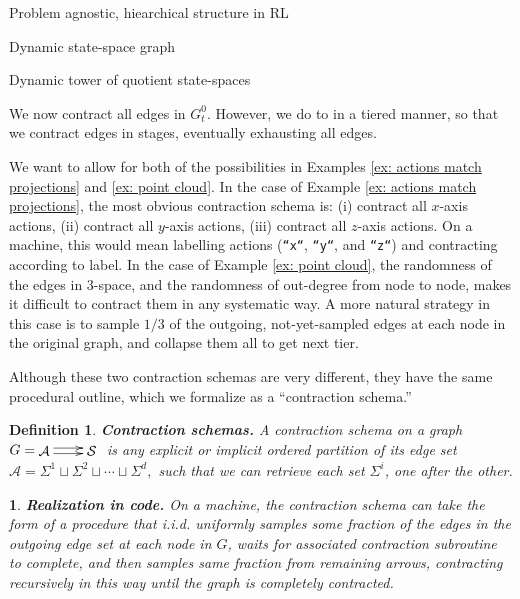 \documentclass[11pt]{article}
\newtheorem{definition}[subsubsection]{Definition}
\newtheorem{ermark}[subsubsection]{}
\begin{document}
\begin{section}{Problem agnostic, hiearchical structure in RL}
\begin{subsection}{Dynamic state-space graph}
\end{subsection}

\begin{subsection}{Dynamic tower of quotient state-spaces}

We now contract all edges in $G^{0}_{t}$. However, we do to in a tiered manner, so that we contract edges in stages, eventually exhausting all edges. 

We want to allow for both of the possibilities in Examples \ref{ex: actions match projections} and \ref{ex: point cloud}. In the case of Example \ref{ex: actions match projections}, the most obvious contraction schema is: (i) contract all $x$-axis actions, (ii) contract all $y$-axis actions, (iii) contract all $z$-axis actions. On a machine, this would mean labelling actions (\texttt{``x``}, \texttt{``y``}, and \texttt{``z``}) and contracting according to label. In the case of Example \ref{ex: point cloud}, the randomness of the edges in $3$-space, and the randomness of out-degree from node to node, makes it difficult to contract them in any systematic way. A more natural strategy in this case is to sample $1/3$ of the outgoing, not-yet-sampled edges at each node in the original graph, and collapse them all to get next tier.

Although these two contraction schemas are very different, they have the same procedural outline, which we formalize as a ``contraction schema.''

\begin{definition}
{\bf Contraction schemas.}
\label{def:contraction-schema}
\normalfont
A {\em contraction schema} on a graph $G=\!\!\begin{xy}
(0,0)*+{\mathcal{A}}="1";
(12,0)*+{\mathcal{S}}="2";
{\ar@<2pt> "1"; "2"};
{\ar@<-2pt> "1"; "2"};
\end{xy}$ is any explicit or implicit ordered partition of its edge set
$
\mathcal{A}
=
\Sigma^1 \sqcup \Sigma^2 \sqcup \cdots \sqcup \Sigma^d,
$
such that we can retrieve each set $\Sigma^{i}$, one after the other.
\end{definition}

\begin{ermark}
{\bf Realization in code.}
\normalfont
On a machine, the contraction schema can take the form of a procedure that i.i.d. uniformly samples some fraction of the edges in the outgoing edge set at each node in $G$, waits for associated contraction subroutine to complete, and then samples same fraction from remaining arrows, contracting recursively in this way until the graph is completely contracted.
\end{ermark}


\end{subsection}
\end{section}
\end{document}

